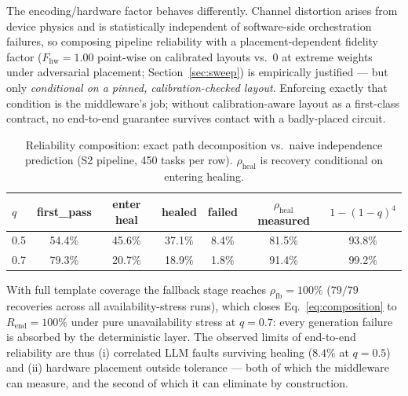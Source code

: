 The encoding/hardware factor behaves differently. Channel distortion arises
from device physics and is statistically independent of software-side
orchestration failures, so composing pipeline reliability with a
placement-dependent fidelity factor
($F_{\mathrm{hw}} = 1.00$ point-wise on calibrated layouts vs.\ $0$ at
extreme weights under adversarial placement; Section~\ref{sec:sweep})
is empirically justified --- but only \emph{conditional on a pinned,
calibration-checked layout}. Enforcing exactly that condition is the
middleware's job; without calibration-aware layout as a first-class
contract, no end-to-end guarantee survives contact with a badly-placed
circuit.

\begin{table}[t]
\centering
\caption{Reliability composition: exact path decomposition vs.\ naive
independence prediction (S2 pipeline, 450 tasks per row). $\rho_{\mathrm{heal}}$
is recovery conditional on entering healing.}
\label{tab:calculus}
\begin{tabular}{lcccccc}
\hline
$q$ & first\_pass & enter heal & healed & failed &
$\rho_{\mathrm{heal}}$ measured & $1-(1-q)^{4}$ \\
\hline
0.5 & 54.4\% & 45.6\% & 37.1\% & 8.4\% & 81.5\% & 93.8\% \\
0.7 & 79.3\% & 20.7\% & 18.9\% & 1.8\% & 91.4\% & 99.2\% \\
\hline
\end{tabular}
\end{table}

With full template coverage the fallback stage reaches
$\rho_{\mathrm{fb}} = 100\%$ ($79/79$ recoveries across all availability-stress
runs), which closes Eq.~\eqref{eq:composition} to $R_{\mathrm{end}} = 100\%$
under pure unavailability stress at $q = 0.7$: every generation failure is
absorbed by the deterministic layer. The observed limits of end-to-end
reliability are thus (i) correlated LLM faults surviving healing
($8.4\%$ at $q=0.5$) and (ii) hardware placement outside tolerance ---
both of which the middleware can measure, and the second of which it can
eliminate by construction.
